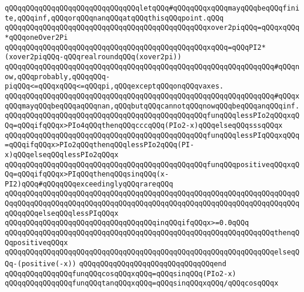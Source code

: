 \verb|qQQqqQQqqQQqqQQqqQQqqQQqqQQqqQQqletqQQq#qQQqqQQqxqQQqmayqQQqbeqQQqfinite,qQQqinf,qQQqorqQQqnanqQQqatqQQqthisqQQqpoint.qQQq|\newline
\verb|qQQqqQQqqQQqqQQqqQQqqQQqqQQqqQQqqQQqqQQqqQQqqQQqxover2piqQQq=qQQqxqQQq*qQQqoneOver2Pi|\newline
\newline
\verb|qQQqqQQqqQQqqQQqqQQqqQQqqQQqqQQqqQQqqQQqqQQqqQQqxqQQq=qQQqPI2*(xover2piqQQq-qQQqrealroundqQQq(xover2pi))|\newline
\newline
\verb|qQQqqQQqqQQqqQQqqQQqqQQqqQQqqQQqqQQqqQQqqQQqqQQqqQQqqQQqqQQqqQQq#qQQqnow,qQQqprobably,qQQqqQQq-piqQQq<=qQQqxqQQq<=qQQqpi,qQQqexceptqQQqonqQQqvaxes.|\newline
\verb|qQQqqQQqqQQqqQQqqQQqqQQqqQQqqQQqqQQqqQQqqQQqqQQqqQQqqQQqqQQqqQQq#qQQqxqQQqmayqQQqbeqQQqaqQQqnan,qQQqbutqQQqcannotqQQqnowqQQqbeqQQqanqQQqinf.|\newline
\newline
\verb|qQQqqQQqqQQqqQQqqQQqqQQqqQQqqQQqqQQqqQQqqQQqqQQqfunqQQqlessPIo2qQQqxqQQq=qQQqifqQQqx>PIo4qQQqthenqQQqcccqQQq(PIo2-x)qQQqelseqQQqsssqQQqx|\newline
\verb|qQQqqQQqqQQqqQQqqQQqqQQqqQQqqQQqqQQqqQQqqQQqqQQqfunqQQqlessPIqQQqxqQQq=qQQqifqQQqx>PIo2qQQqthenqQQqlessPIo2qQQq(PI-x)qQQqelseqQQqlessPIo2qQQqx|\newline
\verb|qQQqqQQqqQQqqQQqqQQqqQQqqQQqqQQqqQQqqQQqqQQqqQQqfunqQQqpositiveqQQqxqQQq=qQQqifqQQqx>PIqQQqthenqQQqsinqQQq(x-PI2)qQQq#qQQqqQQqexceedinglyqQQqrareqQQq|\newline
\verb|qQQqqQQqqQQqqQQqqQQqqQQqqQQqqQQqqQQqqQQqqQQqqQQqqQQqqQQqqQQqqQQqqQQqqQQqqQQqqQQqqQQqqQQqqQQqqQQqqQQqqQQqqQQqqQQqqQQqqQQqqQQqqQQqqQQqqQQqqQQqqQQqqQQqelseqQQqlessPIqQQqx|\newline
\verb|qQQqqQQqqQQqqQQqqQQqqQQqqQQqqQQqqQQqinqQQqifqQQqx>=0.0qQQq|\newline
\verb|qQQqqQQqqQQqqQQqqQQqqQQqqQQqqQQqqQQqqQQqqQQqqQQqqQQqqQQqqQQqqQQqthenqQQqpositiveqQQqx|\newline
\verb|qQQqqQQqqQQqqQQqqQQqqQQqqQQqqQQqqQQqqQQqqQQqqQQqqQQqqQQqqQQqqQQqelseqQQq-(positive(-x))|\newline
\verb|qQQqqQQqqQQqqQQqqQQqqQQqqQQqqQQqend|\newline
\newline
\verb|qQQqqQQqqQQqqQQqfunqQQqcosqQQqxqQQq=qQQqsinqQQq(PIo2-x)|\newline
\newline
\verb|qQQqqQQqqQQqqQQqfunqQQqtanqQQqxqQQq=qQQqsinqQQqxqQQq/qQQqcosqQQqx|\newline
